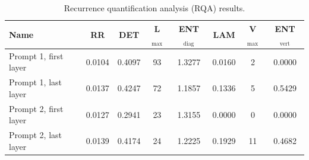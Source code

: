 \documentclass[aip%
 aip,
 amsmath,amssymb,
 reprint,%
]{revtex4-1}
\begin{document}



\begin{table}[H]
\tiny
\centering
\begin{ruledtabular}
\begin{tabular}{lccccccc}
\toprule
Name & RR & DET & L$_{\max}$ & ENT$_\mathrm{diag}$ & LAM & V$_{\max}$ & ENT$_\mathrm{vert}$ \\
\midrule
Prompt 1, first layer & 0.0104 & 0.4097 & 93 & 1.3277 & 0.0160 & 2 & 0.0000 \\
Prompt 1, last layer  & 0.0137 & 0.4247 & 72 & 1.1857 & 0.1336 & 5 & 0.5429 \\
Prompt 2, first layer & 0.0127 & 0.2941 & 23 & 1.3155 & 0.0000 & 0 & 0.0000 \\
Prompt 2, last layer  & 0.0139 & 0.4174 & 24 & 1.2225 & 0.1929 & 11 & 0.4682 \\
\bottomrule
\end{tabular}
\end{ruledtabular}
\caption{Recurrence quantification analysis (RQA) results.}
\label{tab:rqa}
\end{table}
\end{document}
